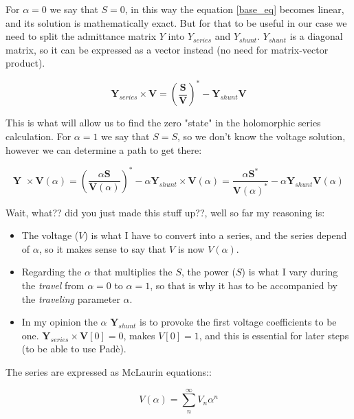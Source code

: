 \documentclass[11pt,fleqn]{book} %
\begin{document}
For $\alpha=0$ we say that $S=0$, in this way the equation \ref{base_eq} becomes linear, and its solution is mathematically exact. But for that to be useful in our case we need to split the admittance matrix $Y$ into $Y_{series}$ and $Y_{shunt}$. $Y_{shunt}$ is a diagonal matrix, so it can be expressed as a vector instead (no need for matrix-vector product).

\begin{equation}
\textbf{Y}_{series} \times \textbf{V} = \left(\frac{\textbf{S}}{\textbf{V}}\right)^* - \textbf{Y}_{shunt} \textbf{V}
\label{base_eq_alpha_0}
\end{equation}

This is what will allow us to find the zero "state" in the holomorphic series calculation. For $\alpha=1$ we say that $S=S$, so we don't know the voltage solution, however we can determine a path to get there:

\begin{equation}
{\textbf{Y }\times \textbf{V}( \alpha )} = \left(\frac{ \alpha\textbf{S}}{\textbf{V}( \alpha )}\right)^* - \alpha \textbf{Y}_{shunt} \times \textbf{V}( \alpha ) = \frac{ \alpha\textbf{S}^*}{\textbf{V}( \alpha )^*} - \alpha \textbf{Y}_{shunt} \textbf{V}( \alpha )
\label{base_eq_embedded}
\end{equation}

Wait, what?? did you just made this stuff up??, well so far my reasoning is:
\begin{itemize}
	\item The voltage ($V$) is what I have to convert into a series, and the series depend of $\alpha$, so it makes sense to say that $V$ is now $V(\alpha)$.
	
	\item Regarding the $\alpha$ that multiplies the $S$, the power ($S$) is what I vary during the \textit{travel} from $\alpha=0$ to $\alpha=1$, so that is why it has to be accompanied by the \textit{traveling} parameter $\alpha.$
	
	\item In my opinion the $\alpha$ $\textbf{Y}_{shunt}$ is to provoke the first voltage coefficients to be one.  $\textbf{Y}_{series} \times \textbf{V}[0] = 0$, makes $V[0]=1$, and this is essential for later steps (to be able to use Padè). \newline
\end{itemize}

The series are expressed as McLaurin equations::

\begin{equation}
V(\alpha) = \sum_{n}^{\infty} V_n \alpha ^n
\end{equation}
\end{document}
